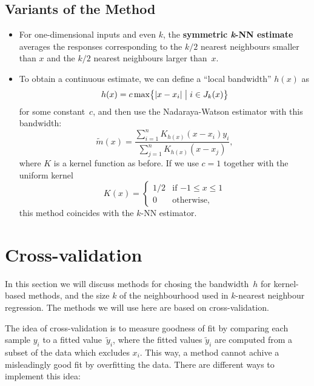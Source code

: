 \documentclass[
  a4paper,
]{article}
\theoremstyle{definition}
\theoremstyle{definition}
\theoremstyle{definition}
\theoremstyle{definition}
\theoremstyle{remark}
\begin{document}
\subsection{Variants of the Method}\label{variants-of-the-method}

\begin{itemize}
\item
  For one-dimensional inputs and even \(k\), the \textbf{symmetric \emph{k}-NN
  estimate} averages the responses corresponding to the \(k/2\) nearest
  neighbours smaller than \(x\) and the \(k/2\) nearest neighbours larger
  than~\(x\).
\item
  To obtain a continuous estimate, we can define a ``local bandwidth''
  \(h(x)\) as \begin{equation*}
    h(x) = c \max\bigl\{ |x - x_i| \bigm| i \in J_k(x) \bigr\}
  \end{equation*} for some constant~\(c\), and then use the
  Nadaraya-Watson estimator with this bandwidth: \begin{equation*}
    \tilde m(x)
    = \frac{\sum_{i=1}^n K_{h(x)}(x - x_i) y_i}{\sum_{j=1}^n K_{h(x)}(x - x_j)},
  \end{equation*} where \(K\) is a kernel function as before. If we use
  \(c = 1\) together with the uniform kernel \begin{equation*}
    K(x)
    = \begin{cases}
        1/2 & \mbox{if $-1 \leq x \leq 1$} \\
        0 & \mbox{otherwise,}
      \end{cases}
  \end{equation*} this method coincides with the \(k\)-NN estimator.
\end{itemize}

\clearpage

\section{Cross-validation}\label{X08-xval}

In this section we will discuss methods for chosing the bandwidth~\(h\)
for kernel-based methods, and the size \(k\) of the neighbourhood used
in \(k\)-nearest neighbour regression. The methods we will use here
are based on cross-validation.

The idea of cross-validation is to measure goodness of fit by comparing each
sample \(y_i\) to a fitted value~\(\tilde y_i\), where the fitted values \(\tilde
y_i\) are computed from a subset of the data which excludes \(x_i\).
This way, a method cannot achive a misleadingly good fit by overfitting the data.
There are different ways to implement this idea:
\end{document}
